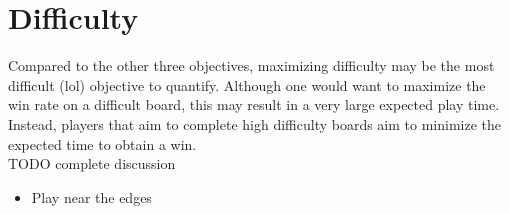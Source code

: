 \section{Difficulty}

Compared to the other three objectives, maximizing difficulty may be the most difficult (lol) objective to quantify. Although one would want to maximize the win rate on a difficult board, this may result in a very large expected play time. Instead, players that aim to complete high difficulty boards aim to minimize the expected time to obtain a win.\\

TODO complete discussion

\begin{itemize}
    \item Play near the edges
\end{itemize}

\iffalse
qwex (1587994) what#8218
for high diff
- take forced guess as soon as you find it
- find logic and complex patterns
- guess better spots, consider safety and progress
- simplify real board and try to calculate safety if possible
- take more aggressive guess when you have less progress
\fi